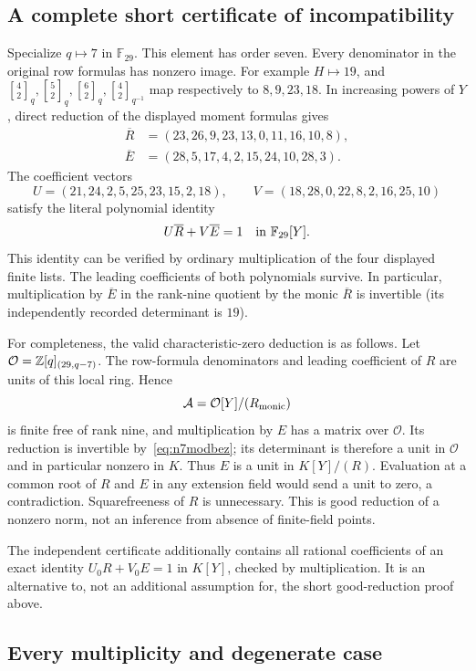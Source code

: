 \documentclass[11pt,letterpaper]{article}
\theoremstyle{definition}\newtheorem{definition}[theorem]{Definition}
\newcommand{\F}{\mathbb F}\newcommand{\tr}{\operatorname{tr}}
\newcommand{\gb}[3]{\genfrac{[}{]}{0pt}{}{#1}{#2}_{#3}}
\begin{document}
\subsection{A complete short certificate of incompatibility}

Specialize $q\mapsto7$ in $\F_{29}$. This element has order seven. Every denominator in the original row formulas has nonzero image. For example $H\mapsto19$, and $\gb42q,\gb52q,\gb62q,\gb42{q^{-1}}$ map respectively to $8,9,23,18$. In increasing powers of $Y$, direct reduction of the displayed moment formulas gives
\begin{align*}
 \overline R&=(23,26,9,23,13,0,11,16,10,8),\\
 \overline E&=(28,5,17,4,2,15,24,10,28,3).
\end{align*}
The coefficient vectors
\[
 U=(21,24,2,5,25,23,15,2,18),\qquad
 V=(18,28,0,22,8,2,16,25,10)
\]
satisfy the literal polynomial identity
\begin{equation}\label{eq:n7modbez}
 U\overline R+V\overline E=1\quad\hbox{in }\F_{29}[Y].
\end{equation}
This identity can be verified by ordinary multiplication of the four displayed finite lists. The leading coefficients of both polynomials survive. In particular, multiplication by $\overline E$ in the rank-nine quotient by the monic $\overline R$ is invertible (its independently recorded determinant is $19$).

For completeness, the valid characteristic-zero deduction is as follows. Let $\mathcal O=\mathbb Z[q]_{(29,q-7)}$. The row-formula denominators and leading coefficient of $R$ are units of this local ring. Hence
\[
 \mathcal A=\mathcal O[Y]/(R_{\rm monic})
\]
is finite free of rank nine, and multiplication by $E$ has a matrix over $\mathcal O$. Its reduction is invertible by~\eqref{eq:n7modbez}; its determinant is therefore a unit in $\mathcal O$ and in particular nonzero in $K$. Thus $E$ is a unit in $K[Y]/(R)$. Evaluation at a common root of $R$ and $E$ in any extension field would send a unit to zero, a contradiction. Squarefreeness of $R$ is unnecessary. This is good reduction of a nonzero norm, not an inference from absence of finite-field points.

The independent certificate additionally contains all rational coefficients of an exact identity $U_0R+V_0E=1$ in $K[Y]$, checked by multiplication. It is an alternative to, not an additional assumption for, the short good-reduction proof above.

\subsection{Every multiplicity and degenerate case}
\end{document}
